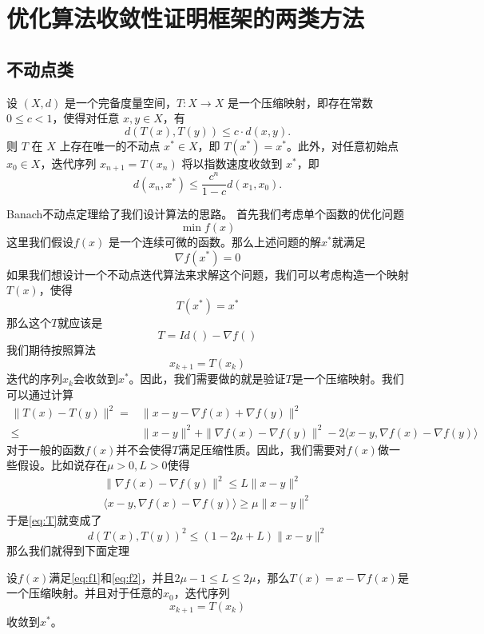 \section{优化算法收敛性证明框架的两类方法}
\subsection{不动点类}
\begin{theorem}[Banach不动点定理] 设 $(X, d)$ 是一个完备度量空间，$T: X \to X$ 是一个压缩映射，即存在常数 $0 \leq c < 1$，使得对任意 $x, y \in X$，有
    \[
    d(T(x), T(y)) \leq c \cdot d(x, y).
    \]
    则 $T$ 在 $X$ 上存在唯一的不动点 $x^* \in X$，即 $T(x^*) = x^*$。此外，对任意初始点 $x_0 \in X$，迭代序列 $x_{n+1} = T(x_n)$ 将以指数速度收敛到 $x^*$，即
    \[
    d(x_n, x^*) \leq \frac{c^n}{1-c} d(x_1, x_0).
    \]
\end{theorem}
Banach不动点定理给了我们设计算法的思路。 首先我们考虑单个函数的优化问题
\begin{equation}\label{eq:opt_problem}
\min f(x)
\end{equation}
这里我们假设$f(x)$ 是一个连续可微的函数。那么上述问题的解$x^*$就满足
\[
\nabla f(x^*) = 0
\]
如果我们想设计一个不动点迭代算法来求解这个问题，我们可以考虑构造一个映射$T(x)$，使得
\[
T(x^*) = x^*
\]
那么这个$T$就应该是
\[
T = Id()-\nabla f()\]
我们期待按照算法$$x_{k+1} = T(x_k)$$迭代的序列$x_k$会收敛到$x^*$。因此，我们需要做的就是验证$T$是一个压缩映射。我们可以通过计算
\begin{equation}\label{eq:T}
    \begin{aligned}
     \|T(x) - T(y)\|^2 
        = &\|x - y - \nabla f(x) + \nabla f(y)\|^2 \\
        \leq& \|x - y\|^2 + \| \nabla f(x) - \nabla f(y)\|^2-2\langle x - y, \nabla f(x) - \nabla f(y)\rangle
    \end{aligned}
\end{equation}
对于一般的函数$f(x)$并不会使得$ T$满足压缩性质。因此，我们需要对$f(x)$做一些假设。比如说存在$\mu>0, L>0$使得
\begin{align}
    \| \nabla f(x) - \nabla f(y)\|^2 \leq L\|x - y\|^2\label{eq:f1}\\
    \langle x - y, \nabla f(x) - \nabla f(y)\rangle \geq \mu\|x - y\|^2\label{eq:f2}
\end{align}
于是\eqref{eq:T}就变成了
\begin{equation}
    d(T(x), T(y))^2 \leq (1 - 2\mu + L)\|x - y\|^2
\end{equation}
那么我们就得到下面定理
\begin{theorem}
设$f(x)$满足\eqref{eq:f1}和\eqref{eq:f2}，并且$2\mu-1\leq L\leq 2\mu$，那么$T(x)=x-\nabla f(x)$是一个压缩映射。并且对于任意的$x_0$，迭代序列
\[x_{k+1} = T(x_k)\]收敛到$x^*$。
\end{theorem}
